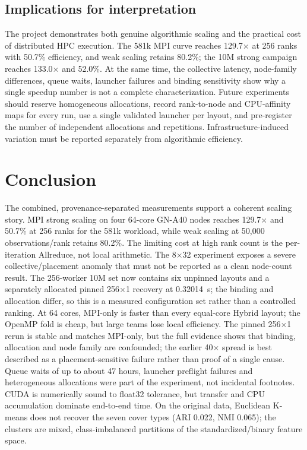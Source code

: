 \documentclass[10pt,a4paper]{article}
\begin{document}
\subsection{Implications for interpretation}
The project demonstrates both genuine algorithmic scaling and the practical
cost of distributed HPC execution. The 581k MPI curve reaches 129.7$\times$ at
256 ranks with 50.7\% efficiency, and weak scaling retains 80.2\%; the 10M
strong campaign reaches 133.0$\times$ and 52.0\%. At the same time, the
collective latency, node-family differences, queue waits, launcher failures
and binding sensitivity show why a single speedup number is not a complete
characterization. Future experiments should reserve homogeneous allocations,
record rank-to-node and CPU-affinity maps for every run, use a single validated
launcher per layout, and pre-register the number of independent allocations
and repetitions. Infrastructure-induced variation must be reported separately
from algorithmic efficiency.

\section{Conclusion}
The combined, provenance-separated measurements support a coherent scaling story. MPI strong scaling on
four 64-core GN-A40 nodes reaches 129.7$\times$ and 50.7\% at 256 ranks for the
581k workload, while weak scaling at 50,000 observations/rank retains 80.2\%.
The limiting cost at high rank count is the per-iteration Allreduce, not local
arithmetic. The 8$\times$32 experiment exposes a severe collective/placement
anomaly that must not be reported as a clean node-count result. The 256-worker
10M set now contains six unpinned layouts and a separately allocated pinned
256$\times$1 recovery at 0.32014~s; the binding and allocation differ, so this
is a measured configuration set rather than a controlled ranking. At 64 cores,
MPI-only is faster than every equal-core Hybrid layout; the OpenMP fold is
cheap, but large teams lose local efficiency. The pinned 256$\times$1 rerun is
stable and matches MPI-only, but the full evidence shows that binding,
allocation and node family are confounded; the earlier 40$\times$ spread is
best described as a placement-sensitive failure rather than proof of a single
cause. Queue waits of up to about 47 hours, launcher preflight failures and
heterogeneous allocations were part of the experiment, not incidental
footnotes. CUDA is numerically sound to float32 tolerance,
but transfer and CPU accumulation dominate end-to-end time. On the original
data, Euclidean K-means does not recover the seven cover types (ARI 0.022,
NMI 0.065); the clusters are mixed, class-imbalanced partitions of the
standardized/binary feature space.
\end{document}
